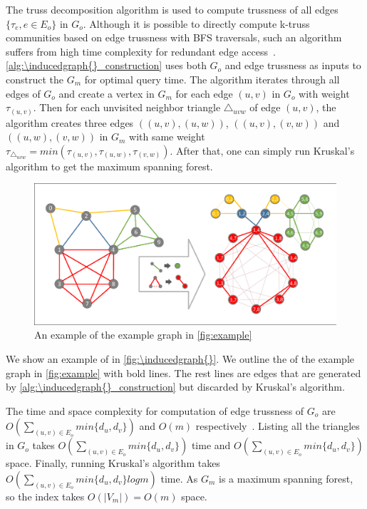 The truss decomposition algorithm \cite{wang2012truss} is used to compute trussness of all edges $\{\tau_{e}, e \in E_{o}\}$ in $G_o$. Although it is possible to directly compute k-truss communities based on edge trussness with BFS traversals, such an algorithm suffers from high time complexity for redundant edge access~\cite{huang2014querying}. \autoref{alg:\inducedgraph{}_construction} uses both $G_o$ and edge trussness as inputs to construct the \inducedgraph{} $G_m$ for optimal query time. The algorithm iterates through all edges of $G_o$ and create a vertex in $G_m$ for each edge $(u,v)$ in $G_o$ with weight $\tau_{(u,v)}$. Then for each unvisited neighbor triangle $\triangle_{uvw}$ of edge $(u,v)$, the algorithm creates three edges $((u,v),(u,w))$, $((u,v),(v,w))$ and $((u,w),(v,w))$ in $G_m$ with same weight $\tau_{\triangle_{uvw}} = min(\tau_{(u,v)}, \tau_{(u,w)}, \tau_{(v,w)})$. After that, one can simply run Kruskal's algorithm to get the maximum spanning forest.

\begin{figure}[ht]
    \centering
    \includegraphics[width=\linewidth]{./figures/induced_graph.pdf}
    \caption{An example \inducedgraph{} of the example graph in \autoref{fig:example}}
    \label{fig:\inducedgraph{}}
\end{figure}

We show an example of \inducedgraph{} in \autoref{fig:\inducedgraph{}}. We outline the \inducedgraph{} of the example graph in \autoref{fig:example} with bold lines. The rest lines are edges that are generated by \autoref{alg:\inducedgraph{}_construction} but discarded by Kruskal's algorithm. 

The time and space complexity for computation of edge trussness of $G_o$ are $O(\sum_{(u,v) \in E_{o}}{min\{d_{u},d_{v}\}})$ and $O(m)$ respectively~\cite{huang2014querying}. Listing all the triangles in $G_o$ takes $O(\sum_{(u,v) \in E_{o}}{min\{d_{u},d_{v}\}})$ time and $O(\sum_{(u,v) \in E_{o}}{min\{d_{u},d_{v}\}})$ space. Finally, running Kruskal's algorithm takes $O(\sum_{(u,v) \in E_{o}}{min\{d_{u},d_{v}\}}log{m})$ time. As $G_m$ is a maximum spanning forest, so the \inducedgraph{} index takes $O(|V_m|) = O(m)$ space.

